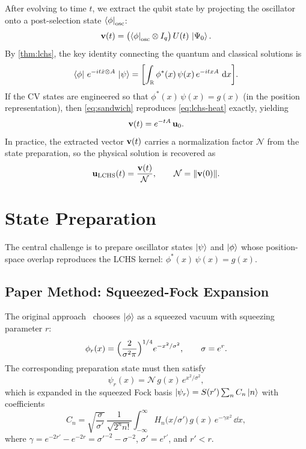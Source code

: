 \documentclass[11pt]{article}
\begin{document}
After evolving to time $t$, we extract the qubit state by projecting the
oscillator onto a post-selection state $\bra{\phi}_{\mathrm{osc}}$:
\begin{equation}\label{eq:postselect}
  \vb{v}(t) = \bigl(\bra{\phi}_{\mathrm{osc}} \otimes I_q\bigr)\,
  U(t)\,\ket{\Psi_0}.
\end{equation}
By \cref{thm:lchs}, the key identity connecting the quantum and classical
solutions is
\begin{equation}\label{eq:sandwich}
  \bra{\phi}\, e^{-it\hat{x}\otimes A}\, \ket{\psi}
  = \biggl[\int_{\mathbb{R}} \phi^*(x)\,\psi(x)\, e^{-itxA}\,\dd{x}\biggr].
\end{equation}
If the CV states are engineered so that
$\phi^*(x)\,\psi(x) = g(x)$ (in the position representation), then
\cref{eq:sandwich} reproduces \cref{eq:lchs-heat} exactly, yielding
\begin{equation}
  \vb{v}(t) = e^{-tA}\,\vb{u}_0.
\end{equation}
In practice, the extracted vector $\vb{v}(t)$ carries a normalization factor
$\mathcal{N}$ from the state preparation, so the physical solution is recovered as
\begin{equation}\label{eq:normalize}
  \vb{u}_{\mathrm{LCHS}}(t) = \frac{\vb{v}(t)}{\mathcal{N}},
  \qquad \mathcal{N} = \norm{\vb{v}(0)}.
\end{equation}

\section{State Preparation}\label{sec:state-prep}

The central challenge is to prepare oscillator states
$\ket{\psi}$ and $\ket{\phi}$ whose position-space overlap reproduces the
LCHS kernel: $\phi^*(x)\,\psi(x) = g(x)$.

\subsection{Paper Method: Squeezed-Fock Expansion}

The original approach~\cite{das2025} chooses $\ket{\phi}$ as a squeezed vacuum
with squeezing parameter $r$:
\begin{equation}
  \phi_r(x) = \Bigl(\frac{2}{\sigma^2\pi}\Bigr)^{1/4} e^{-x^2/\sigma^2},
  \qquad \sigma = e^r.
\end{equation}
The corresponding preparation state must then satisfy
\begin{equation}\label{eq:psi-r}
  \psi_r(x) = \mathcal{N}\, g(x)\, e^{x^2/\sigma^2},
\end{equation}
which is expanded in the squeezed Fock basis
$\ket{\psi_r} = S(r') \sum_{n} C_n \ket{n}$ with coefficients
\begin{equation}\label{eq:Cn}
  C_n = \sqrt{\frac{\sigma}{\sigma'}}\,\frac{1}{\sqrt{2^n n!}}
  \int_{-\infty}^{\infty} H_n\!\bigl(x/\sigma'\bigr)\, g(x)\,
  e^{-\gamma x^2}\,\dd{x},
\end{equation}
where $\gamma = e^{-2r'} - e^{-2r} = \sigma'^{-2} - \sigma^{-2}$,
$\sigma' = e^{r'}$, and $r' < r$.
\end{document}
